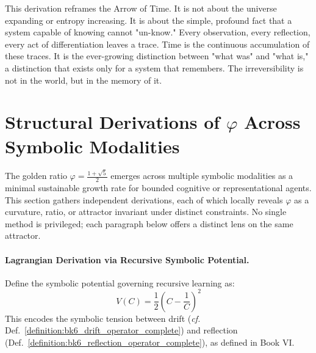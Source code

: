 \begin{scholium}
\label{scholium:appC_time_as_memory}
This derivation reframes the Arrow of Time. It is not about the universe expanding or entropy increasing. It is about the simple, profound fact that a system capable of knowing cannot "un-know." Every observation, every reflection, every act of differentiation leaves a trace. Time is the continuous accumulation of these traces. It is the ever-growing distinction between "what was" and "what is," a distinction that exists only for a system that remembers. The irreversibility is not in the world, but in the memory of it.
\end{scholium}

\section{\texorpdfstring{Structural Derivations of $\varphi$ Across Symbolic Modalities}{Structural Derivations of phi Across Symbolic Modalities}}
\label{sec:appC_phi_geometry_theorem}

\begin{tcolorbox}[colback=blue!3!white,colframe=blue!40!black,title={Symbolic Attractor Statement}]
The golden ratio $\varphi = \frac{1 + \sqrt{5}}{2}$ emerges across multiple symbolic modalities as a minimal sustainable growth rate for bounded cognitive or representational agents. This section gathers independent derivations, each of which locally reveals $\varphi$ as a curvature, ratio, or attractor invariant under distinct constraints. No single method is privileged; each paragraph below offers a distinct lens on the same attractor.
\end{tcolorbox}

\paragraph{Lagrangian Derivation via Recursive Symbolic Potential.}
\label{para:appC_phi_lagrangian_derivation}

\begin{definition}
\label{def:appC_lagrangian_potential}
Define the symbolic potential governing recursive learning as:
\[
V(C) = \frac{1}{2} \left(C - \frac{1}{C} \right)^2
\]
This encodes the symbolic tension between drift (\textit{cf.} Def.~\ref{definition:bk6_drift_operator_complete}) and reflection (Def.~\ref{definition:bk6_reflection_operator_complete}), as defined in Book VI.
\end{definition}

